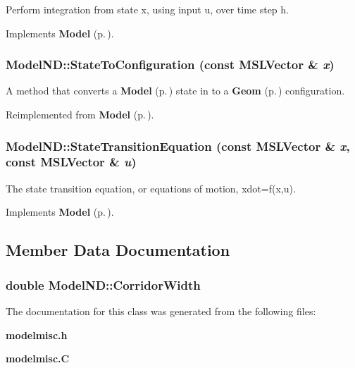 Perform integration from state x, using input u, over time step h.



Implements {\bf Model} {\rm (p.\,\pageref{classModel_a5})}.
\subsubsection{ Model\-ND::State\-To\-Configuration (const {\bf MSLVector} \& {\em x})\hspace{0.3cm}{\tt  [virtual]}}\label{classModelND_a2}


A method that converts a {\bf Model} {\rm (p.\,\pageref{classModel})} state in to a {\bf Geom} {\rm (p.\,\pageref{classGeom})} configuration.



Reimplemented from {\bf Model} {\rm (p.\,\pageref{classModel_a8})}.
\subsubsection{ Model\-ND::State\-Transition\-Equation (const {\bf MSLVector} \& {\em x}, const {\bf MSLVector} \& {\em u})\hspace{0.3cm}{\tt  [virtual]}}\label{classModelND_a4}


The state transition equation, or equations of motion, xdot=f(x,u).



Implements {\bf Model} {\rm (p.\,\pageref{classModel_a3})}.

\subsection{Member Data Documentation}
\subsubsection{\setlength{\rightskip}{0pt plus 5cm}double Model\-ND::Corridor\-Width}\label{classModelND_m0}




The documentation for this class was generated from the following files:\begin{CompactItemize}
\item 
{\bf modelmisc.h}\item 
{\bf modelmisc.C}\end{CompactItemize}

